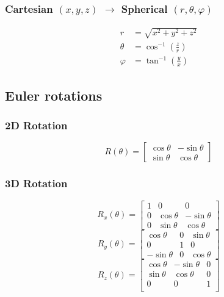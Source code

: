 \documentclass{article}
\newcommand{\phase}{\varphi}
\begin{document}
\subsubsection{Cartesian $(x,y,z)$ $\rightarrow$ Spherical $(r,\theta,\phase)$}
\begin{equation}
    \begin{aligned}
        r &= \sqrt{x^2+y^2+z^2} \\
        \theta &= \cos^{-1} \left(\frac{z}{r}\right) \\
        \phase &= \tan^{-1} \left(\frac{y}{x}\right)
    \end{aligned}
\end{equation}

\subsection{Euler rotations}

\subsubsection{2D Rotation}
\begin{equation}
    R(\theta) = \begin{bmatrix}
        \cos\theta & -\sin\theta \\
        \sin\theta & \cos\theta
    \end{bmatrix}
\end{equation}

\subsubsection{3D Rotation}
\begin{equation}
    R_x(\theta) = \begin{bmatrix}
        1 & 0 & 0 \\
        0 & \cos\theta & -\sin\theta \\
        0 & \sin\theta & \cos\theta
    \end{bmatrix}
\end{equation}
\begin{equation}
    R_y(\theta) = \begin{bmatrix}
        \cos\theta & 0 & \sin\theta \\
        0 & 1 & 0 \\
        -\sin\theta & 0 & \cos\theta
    \end{bmatrix}
\end{equation}
\begin{equation}
    R_z(\theta) = \begin{bmatrix}
        \cos\theta & -\sin\theta & 0 \\
        \sin\theta & \cos\theta & 0 \\
        0 & 0 & 1 \\
    \end{bmatrix}
\end{equation}
\end{document}
